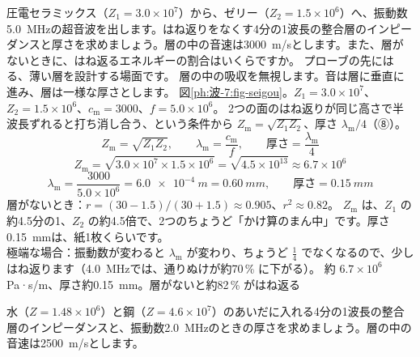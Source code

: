 \label{ph:波-7:ex6}
\begin{phreidai}[超音波のプローブの整合層]
圧電セラミックス（$Z_1=3.0\times10^7$）から、ゼリー（$Z_2=1.5\times10^6$）へ、振動数\qty{5.0}{MHz}の超音波を出します。はね返りをなくす4分の1波長の整合層のインピーダンスと厚さを求めましょう。層の中の音速は\qty{3000}{m/s}とします。また、層がないときに、はね返るエネルギーの割合はいくらですか。
\phbamen
プローブの先にはる、薄い層を設計する場面です。
\phmushi
層の中の吸収を無視します。音は層に垂直に進み、層は一様な厚さとします。
\phzu
図\ref{ph:波-7:fig-seigou}。$Z_1=3.0\times10^7$、$Z_2=1.5\times10^6$、$c_{\mathrm m}=3000$、$f=5.0\times10^6$。
\phriyu
2つの面のはね返りが同じ高さで半波長ずれると打ち消し合う、という条件から $Z_{\mathrm m}=\sqrt{Z_1Z_2}$、厚さ $\lambda_{\mathrm m}/4$（⑧）。
\phtateru
\[Z_{\mathrm m}=\sqrt{Z_1Z_2},\qquad\lambda_{\mathrm m}=\frac{c_{\mathrm m}}{f},\qquad\text{厚さ}=\frac{\lambda_{\mathrm m}}{4}\]
\phtoku
\[Z_{\mathrm m}=\sqrt{3.0\times10^7\times1.5\times10^6}=\sqrt{4.5\times10^{13}}\approx6.7\times10^6\]
\[\lambda_{\mathrm m}=\frac{3000}{5.0\times10^6}=\qty{6.0e-4}{m}=\qty{0.60}{mm},\qquad\text{厚さ}=\qty{0.15}{mm}\]
層がないとき：$r=(30-1.5)/(30+1.5)\approx0.905$、$r^2\approx0.82$。
\phtashikame
$Z_{\mathrm m}$ は、$Z_1$ の約4.5分の1、$Z_2$ の約4.5倍で、2つのちょうど「かけ算のまん中」です。厚さ\qty{0.15}{mm}は、紙1枚くらいです。\\
極端な場合：振動数が変わると $\lambda_{\mathrm m}$ が変わり、ちょうど $\tfrac14$ でなくなるので、少しはね返ります（\qty{4.0}{MHz}では、通りぬけが約70\,\% に下がる）。
\kotae 約 $6.7\times10^6$ Pa·s/m、厚さ約\qty{0.15}{mm}。層がないと約82\,\% がはね返る
\end{phreidai}
\begin{jibun}
水（$Z=1.48\times10^6$）と鋼（$Z=4.6\times10^7$）のあいだに入れる4分の1波長の整合層のインピーダンスと、振動数\qty{2.0}{MHz}のときの厚さを求めましょう。層の中の音速は\qty{2500}{m/s}とします。
\end{jibun}

